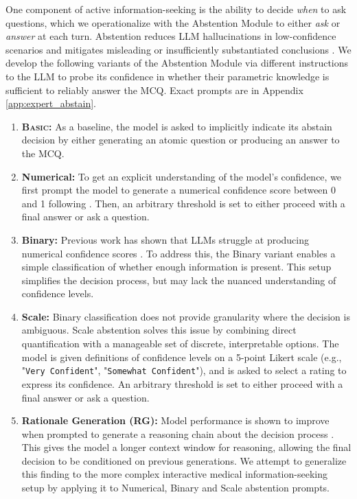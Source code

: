 \documentclass{article}
\begin{document}
One component of active information-seeking is the ability to decide \emph{when} to ask questions, which we operationalize with the Abstention Module to either \emph{ask} or \emph{answer} at each turn. Abstention reduces LLM hallucinations in low-confidence scenarios \citep{umapathi2023med, rawte2023survey} and mitigates misleading or insufficiently substantiated conclusions \citep{feng2024dont}. We develop the following variants of the Abstention Module via different instructions to the LLM to probe its confidence in whether their parametric knowledge is sufficient to reliably answer the MCQ. Exact prompts are in Appendix \ref{app:expert_abstain}.\vspace{-0.5mm}

\begin{enumerate}
[noitemsep,topsep=0pt,leftmargin=12pt]
\item[\textbf{0.}] \textbf{\textsc{Basic}:} As a baseline, the model is asked to implicitly indicate its abstain decision by either generating an atomic question or producing an answer to the MCQ.%

\item[\textbf{1.}] \textbf{Numerical:} To get an explicit understanding of the model's confidence, we first prompt the model to generate a numerical confidence score between 0 and 1 following \citep{tian2023just}. 
Then, an arbitrary threshold is set to either proceed with a final answer or ask a question.

\item[\textbf{2.}] \textbf{Binary:} Previous work has shown that LLMs struggle at producing numerical confidence scores \citep{srivastava2022beyond, geng2023survey}. To address this, the Binary variant enables a simple classification of whether enough information is present. 
This setup simplifies the decision process, but may lack the nuanced understanding of confidence levels.

\item[\textbf{3.}] \textbf{Scale:} Binary classification does not provide granularity where the decision is ambiguous. Scale abstention solves this issue by combining direct quantification with a manageable set of discrete, interpretable options.
The model is given definitions of confidence levels on a 5-point Likert scale (e.g., "\texttt{Very Confident}", "\texttt{Somewhat Confident}"), and is asked to select a rating to express its confidence. An arbitrary threshold is set to either proceed with a final answer or ask a question.

\item[\textbf{4.}] \textbf{Rationale Generation (RG):} Model performance is shown to improve when prompted to generate a reasoning chain about the decision process \citep{wei2022chain, marasovic2021few}. This gives the model a longer context window for reasoning, allowing the final decision to be conditioned on previous generations. We attempt to generalize this finding to the more complex interactive medical information-seeking setup 
by applying it to Numerical, Binary and Scale abstention prompts.


\end{enumerate}
\end{document}
